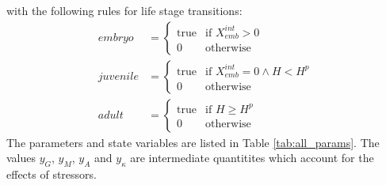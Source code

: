 %
with the following rules for life stage transitions: 
%
\begin{align}
    embryo &= 
    \begin{cases}
        \text{true} & \text{if } X_{emb}^{int} > 0 \\
        0 & \text{otherwise}
    \end{cases} \\
    juvenile &= 
    \begin{cases}
        \text{true} & \text{if } X_{emb}^{int} = 0 \land H < H^p \\ 
        0 & \text{otherwise}
    \end{cases} \\
    adult &= 
    \begin{cases}
        \text{true} & \text{if } H \geq H^p \\ 
        0 & \text{otherwise}
    \end{cases}
    \label{eq:lifestages}
\end{align}%
%
The parameters and state variables are listed in Table \ref{tab:all_params}.
The values $y_G$, $y_M$, $y_A$ and $y_{\kappa}$ 
are intermediate quantitites which account for the effects of stressors.
